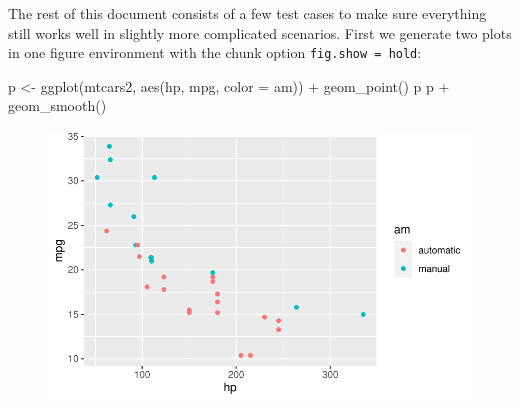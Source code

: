 \documentclass[
  letterpaper,
  DIV=11,
  numbers=noendperiod,
  oneside]{scrartcl}
\newenvironment{Shaded}{\begin{snugshade}}{\end{snugshade}}
\newcommand{\AttributeTok}[1]{\textcolor[rgb]{0.40,0.45,0.13}{#1}}
\newcommand{\FunctionTok}[1]{\textcolor[rgb]{0.28,0.35,0.67}{#1}}
\newcommand{\NormalTok}[1]{\textcolor[rgb]{0.00,0.23,0.31}{#1}}
\newcommand{\OtherTok}[1]{\textcolor[rgb]{0.00,0.23,0.31}{#1}}
\newcommand{\SpecialCharTok}[1]{\textcolor[rgb]{0.37,0.37,0.37}{#1}}
\begin{document}
The rest of this document consists of a few test cases to make sure
everything still works well in slightly more complicated scenarios.
First we generate two plots in one figure environment with the chunk
option \texttt{fig.show\ =\ \textquotesingle{}hold\textquotesingle{}}:

\begin{Shaded}
\begin{Highlighting}[]
\NormalTok{p }\OtherTok{\textless{}{-}} \FunctionTok{ggplot}\NormalTok{(mtcars2, }\FunctionTok{aes}\NormalTok{(hp, mpg, }\AttributeTok{color =}\NormalTok{ am)) }\SpecialCharTok{+}
  \FunctionTok{geom\_point}\NormalTok{()}
\NormalTok{p}
\NormalTok{p }\SpecialCharTok{+} \FunctionTok{geom\_smooth}\NormalTok{()}
\end{Highlighting}
\end{Shaded}

\begin{figure}[H]


{\centering \includegraphics{cv_files/figure-pdf/fig-two-together-1.pdf}

}

\end{figure}
\end{document}
